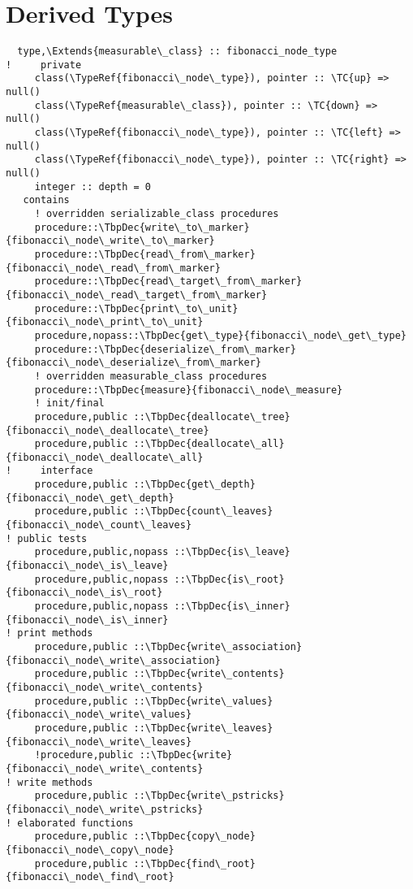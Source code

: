 \section{Derived Types}
\begin{Verbatim}
  type,\Extends{measurable\_class} :: fibonacci_node_type
!     private
     class(\TypeRef{fibonacci\_node\_type}), pointer :: \TC{up} => null()
     class(\TypeRef{measurable\_class}), pointer :: \TC{down} => null()
     class(\TypeRef{fibonacci\_node\_type}), pointer :: \TC{left} => null()
     class(\TypeRef{fibonacci\_node\_type}), pointer :: \TC{right} => null()
     integer :: depth = 0
   contains
     ! overridden serializable_class procedures
     procedure::\TbpDec{write\_to\_marker}{fibonacci\_node\_write\_to\_marker}
     procedure::\TbpDec{read\_from\_marker}{fibonacci\_node\_read\_from\_marker}
     procedure::\TbpDec{read\_target\_from\_marker}{fibonacci\_node\_read\_target\_from\_marker}
     procedure::\TbpDec{print\_to\_unit}{fibonacci\_node\_print\_to\_unit}
     procedure,nopass::\TbpDec{get\_type}{fibonacci\_node\_get\_type}
     procedure::\TbpDec{deserialize\_from\_marker}{fibonacci\_node\_deserialize\_from\_marker}
     ! overridden measurable_class procedures
     procedure::\TbpDec{measure}{fibonacci\_node\_measure}
     ! init/final
     procedure,public ::\TbpDec{deallocate\_tree}{fibonacci\_node\_deallocate\_tree}
     procedure,public ::\TbpDec{deallocate\_all}{fibonacci\_node\_deallocate\_all}
!     interface
     procedure,public ::\TbpDec{get\_depth}{fibonacci\_node\_get\_depth}
     procedure,public ::\TbpDec{count\_leaves}{fibonacci\_node\_count\_leaves}
! public tests
     procedure,public,nopass ::\TbpDec{is\_leave}{fibonacci\_node\_is\_leave}
     procedure,public,nopass ::\TbpDec{is\_root}{fibonacci\_node\_is\_root}
     procedure,public,nopass ::\TbpDec{is\_inner}{fibonacci\_node\_is\_inner}
! print methods
     procedure,public ::\TbpDec{write\_association}{fibonacci\_node\_write\_association}
     procedure,public ::\TbpDec{write\_contents}{fibonacci\_node\_write\_contents}
     procedure,public ::\TbpDec{write\_values}{fibonacci\_node\_write\_values}
     procedure,public ::\TbpDec{write\_leaves}{fibonacci\_node\_write\_leaves}
     !procedure,public ::\TbpDec{write}{fibonacci\_node\_write\_contents}
! write methods
     procedure,public ::\TbpDec{write\_pstricks}{fibonacci\_node\_write\_pstricks}
! elaborated functions
     procedure,public ::\TbpDec{copy\_node}{fibonacci\_node\_copy\_node}
     procedure,public ::\TbpDec{find\_root}{fibonacci\_node\_find\_root}

\end{Verbatim}
